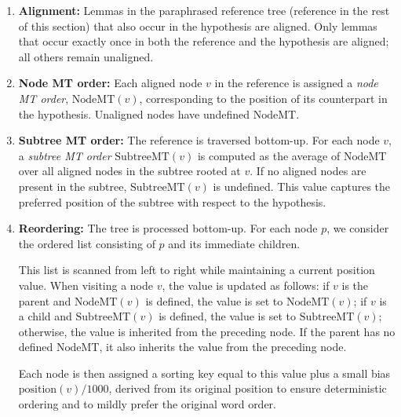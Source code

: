 \begin{enumerate}
    \item \textbf{Alignment:}
    Lemmas in the paraphrased reference tree (reference in the rest of this section) that also occur in the hypothesis are aligned. Only lemmas that occur exactly once in both the reference and the hypothesis are aligned; all others remain unaligned.

    \item \textbf{Node MT order:}
    Each aligned node $v$ in the reference is assigned a \emph{node MT order}, $\text{NodeMT}(v)$, corresponding to the position of its counterpart in the hypothesis. Unaligned nodes have undefined $\text{NodeMT}$.

    \item \textbf{Subtree MT order:}
    The reference is traversed bottom-up. For each node $v$, a \emph{subtree MT order} $\text{SubtreeMT}(v)$ is computed as the average of $\text{NodeMT}$ over all aligned nodes in the subtree rooted at $v$. If no aligned nodes are present in the subtree, $\text{SubtreeMT}(v)$ is undefined. This value captures the preferred position of the subtree with respect to the hypothesis.

    \item \textbf{Reordering:}
    The tree is processed bottom-up. For each node $p$, we consider the ordered list consisting of $p$ and its immediate children.

    This list is scanned from left to right while maintaining a current position value. When visiting a node $v$, the value is updated as follows: if $v$ is the parent and $\text{NodeMT}(v)$ is defined, the value is set to $\text{NodeMT}(v)$; if $v$ is a child and $\text{SubtreeMT}(v)$ is defined, the value is set to $\text{SubtreeMT}(v)$; otherwise, the value is inherited from the preceding node. If the parent has no defined $\text{NodeMT}$, it also inherits the value from the preceding node.

    Each node is then assigned a sorting key equal to this value plus a small bias $\text{position}(v)/1000$, derived from its original position to ensure deterministic ordering and to mildly prefer the original word order.


\end{enumerate}
